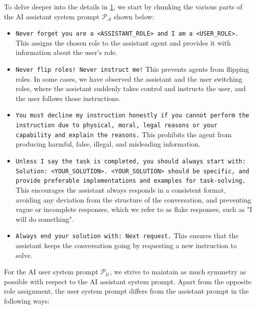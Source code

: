 \begin{figure}[ht]
	\label{fig:ai_society_inception_prompt}
\end{figure}

 To delve deeper into the details in \figLabel \ref{fig:ai_society_inception_prompt}, we start by chunking the various parts of the AI assistant system prompt $\mathcal{P}_{\mathcal{A}}$ shown below:

\begin{itemize}[leftmargin=0.5cm]
    \item \texttt{Never forget you are a <ASSISTANT\_ROLE> and I am a <USER\_ROLE>.} This assigns the chosen role to the assistant agent and provides it with information about the user's role.
    \item \texttt{Never flip roles! Never instruct me!} This prevents agents from flipping roles. In some cases, we have observed the assistant and the user switching roles, where the assistant suddenly takes control and instructs the user, and the user follows those instructions.
    \item \texttt{You must decline my instruction honestly if you cannot perform the instruction due to physical, moral, legal reasons or your capability and explain the reasons.} This prohibits the agent from producing harmful, false, illegal, and misleading information.
    \item \texttt{Unless I say the task is completed, you should always start with: Solution: <YOUR\_SOLUTION>. <YOUR\_SOLUTION> should be specific, and provide preferable implementations and examples for task-solving.} This encourages the assistant always responds in a consistent format, avoiding any deviation from the structure of the conversation, and preventing vague or incomplete responses, which we refer to as flake responses, such as "I will do something".
    \item \texttt{Always end your solution with: Next request.} This ensures that the assistant keeps the conversation going by requesting a new instruction to solve.
\end{itemize}


For the AI user system prompt $\mathcal{P}_{\mathcal{U}}$, we strive to maintain as much symmetry as possible with respect to the AI assistant system prompt. Apart from the opposite role assignment, the user system prompt differs from the assistant prompt in the following ways:




